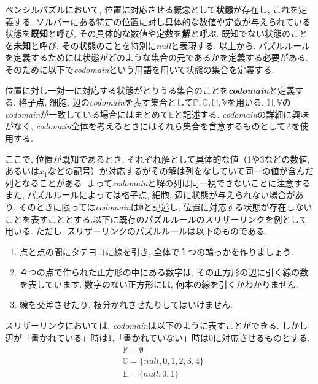 ペンシルパズルにおいて, 位置に対応させる概念として\textbf{状態}が存在し, これを定義する. ソルバーにある特定の位置に対し具体的な数値や定数が与えられている状態を\textbf{既知}と呼び, その具体的な数値や定数を\textbf{解}と呼ぶ. 既知でない状態のことを\textbf{未知}と呼び, その状態のことを特別に\textit{null}と表現する.
以上から, パズルルールを定義するためには状態がどのような集合の元であるかを定義する必要がある. そのために以下で\textit{codomain}という用語を用いて状態の集合を定義する.

\begin{definition}\label{definition:Codomain}
  位置に対し一対一に対応する状態がとりうる集合のことを\textbf{\textit{codomain}}と定義する. 格子点, 細胞, 辺の\textit{codomain}を表す集合として$\mathbb{P},\mathbb{C},\mathbb{H},\mathbb{V}$を用いる. $\mathbb{H},\mathbb{V}$の\textit{codomain}が一致している場合にはまとめて$\mathbb{E}$と記述する. \textit{codomain}の詳細に興味がなく, \textit{codomain}全体を考えるときにはそれら集合を含意するものとして$\Lambda$を使用する.
\end{definition}

ここで, 位置が既知であるとき, それぞれ解として具体的な値（1や3などの数値, あるいは$x_1$などの記号）が対応するがその解は列をなしていて同一の値が含んだ列となることがある.
よって\textit{codomain}と解の列は同一視できないことに注意する. また, パズルルールによっては格子点, 細胞, 辺に状態が与えられない場合があり, そのときに限っては\textit{codomain}は$\emptyset$と記述し, 位置に対応する状態が存在しないことを表すこととする.以下に既存のパズルルールのスリザーリンクを例として用いる. ただし, スリザーリンクのパズルルールは以下のものである. \cite{web:SlitherLink}

\begin{enumerate}
  \item 点と点の間にタテヨコに線を引き, 全体で１つの輪っかを作りましょう.
  \item ４つの点で作られた正方形の中にある数字は, その正方形の辺に引く線の数を表しています. 数字のない正方形には, 何本の線を引くかわかりません.
  \item 線を交差させたり, 枝分かれさせたりしてはいけません.
\end{enumerate}



\begin{example}\label{example:SlitherLinkCodomain}
  スリザーリンクにおいては, \textit{codomain}は以下のように表すことができる. しかし辺が「書かれている」時は1,「書かれていない」時は0に対応させるものとする.
  \begin{align*}
     & \mathbb{P}  =  \emptyset                   \\
     & \mathbb{C}  =  \{\textit{null},0,1,2,3,4\} \\
     & \mathbb{E}  =  \{\textit{null},0,1\}
  \end{align*}
\end{example}



